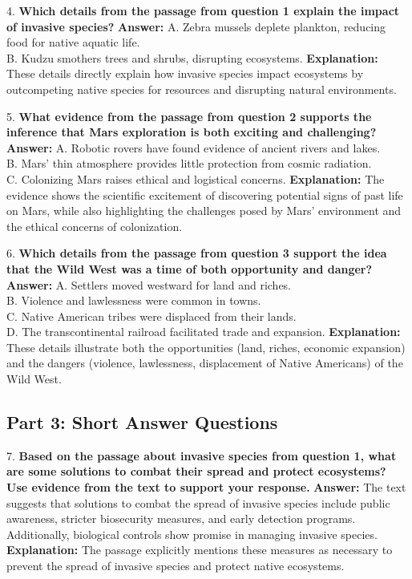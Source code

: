 \documentclass[12pt]{article}
\begin{document}
4. \textbf{Which details from the passage from question 1 explain the impact of invasive species?}  
\textbf{Answer:} A. Zebra mussels deplete plankton, reducing food for native aquatic life. \\
B. Kudzu smothers trees and shrubs, disrupting ecosystems.  
\textbf{Explanation:} These details directly explain how invasive species impact ecosystems by outcompeting native species for resources and disrupting natural environments.

\vspace{1cm}
5. \textbf{What evidence from the passage from question 2 supports the inference that Mars exploration is both exciting and challenging?}  
\textbf{Answer:} A. Robotic rovers have found evidence of ancient rivers and lakes. \\
B. Mars’ thin atmosphere provides little protection from cosmic radiation. \\
C. Colonizing Mars raises ethical and logistical concerns.  
\textbf{Explanation:} The evidence shows the scientific excitement of discovering potential signs of past life on Mars, while also highlighting the challenges posed by Mars' environment and the ethical concerns of colonization.

\vspace{1cm}
6. \textbf{Which details from the passage from question 3 support the idea that the Wild West was a time of both opportunity and danger?}  
\textbf{Answer:} A. Settlers moved westward for land and riches. \\
B. Violence and lawlessness were common in towns. \\
C. Native American tribes were displaced from their lands. \\
D. The transcontinental railroad facilitated trade and expansion.  
\textbf{Explanation:} These details illustrate both the opportunities (land, riches, economic expansion) and the dangers (violence, lawlessness, displacement of Native Americans) of the Wild West.

\subsection*{Part 3: Short Answer Questions}

7. \textbf{Based on the passage about invasive species from question 1, what are some solutions to combat their spread and protect ecosystems? Use evidence from the text to support your response.}  
\textbf{Answer:} The text suggests that solutions to combat the spread of invasive species include public awareness, stricter biosecurity measures, and early detection programs. Additionally, biological controls show promise in managing invasive species.  
\textbf{Explanation:} The passage explicitly mentions these measures as necessary to prevent the spread of invasive species and protect native ecosystems.
\end{document}
